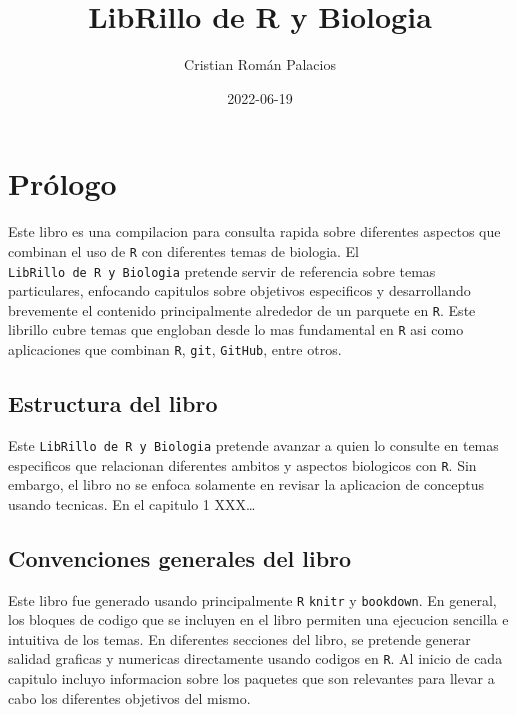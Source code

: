 \documentclass[
]{book}
\title{LibRillo de R y Biologia}
\author{Cristian Román Palacios}
\date{2022-06-19}
\begin{document}
\maketitle

{
\setcounter{tocdepth}{2}
\tableofcontents
}
\hypertarget{pruxf3logo}{%
\chapter*{Prólogo}\label{pruxf3logo}}


Este libro es una compilacion para consulta rapida sobre diferentes aspectos que combinan el uso de \texttt{R} con diferentes temas de biologia. El \texttt{LibRillo\ de\ R\ y\ Biologia} pretende servir de referencia sobre temas particulares, enfocando capitulos sobre objetivos especificos y desarrollando brevemente el contenido principalmente alrededor de un parquete en \texttt{R}. Este librillo cubre temas que engloban desde lo mas fundamental en \texttt{R} asi como aplicaciones que combinan \texttt{R}, \texttt{git}, \texttt{GitHub}, entre otros.

\hypertarget{estructura-del-libro}{%
\section*{Estructura del libro}\label{estructura-del-libro}}


Este \texttt{LibRillo\ de\ R\ y\ Biologia} pretende avanzar a quien lo consulte en temas especificos que relacionan diferentes ambitos y aspectos biologicos con \texttt{R}. Sin embargo, el libro no se enfoca solamente en revisar la aplicacion de conceptus usando tecnicas. En el capitulo 1 XXX\ldots{}

\hypertarget{convenciones-generales-del-libro}{%
\section*{Convenciones generales del libro}\label{convenciones-generales-del-libro}}


Este libro fue generado usando principalmente \texttt{R} \texttt{knitr} y \texttt{bookdown}. En general, los bloques de codigo que se incluyen en el libro permiten una ejecucion sencilla e intuitiva de los temas. En diferentes secciones del libro, se pretende generar salidad graficas y numericas directamente usando codigos en \texttt{R}. Al inicio de cada capitulo incluyo informacion sobre los paquetes que son relevantes para llevar a cabo los diferentes objetivos del mismo.
\end{document}
